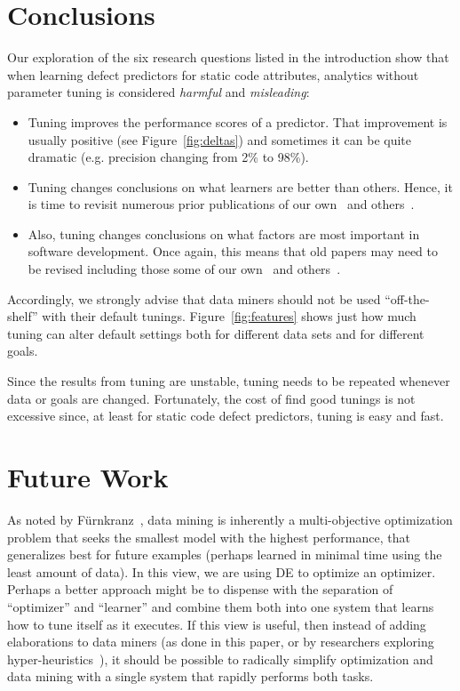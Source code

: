 \documentclass{sig-alternative}
\newcommand{\bi}{\begin{itemize}[leftmargin=0.4cm]}
\newcommand{\ei}{\end{itemize}}
\newcommand{\fig}[1]{Figure~\ref{fig:#1}}
\begin{document}
\section{Conclusions}

Our exploration of the six research
questions listed in the introduction
show that when learning defect predictors for static code
attributes,   analytics without parameter tuning is considered {\em harmful} and {\em misleading}:
\bi
\item Tuning improves the performance scores of a predictor.
That improvement is usually positive (see \fig{deltas}) and sometimes
it can be quite   dramatic (e.g. precision changing from 2\% to 98\%). \item 
Tuning changes conclusions on what learners are better than others.
Hence, it is time to revisit numerous prior publications of our own~\cite{me07b}
and others~\cite{lessmann2008benchmarking,hall11}.
\item
Also,
tuning changes conclusions on what factors are most important in software development.
Once again, this means that old papers may need to be revised including those
some of our own~\cite{me02k} and others~\cite{bell2013limited,rahman2013how,moser2008comparative,zimmermann2007predicting,herzig2013predicting}. 
\ei
Accordingly, we strongly advise that data miners should not be used ``off-the-shelf'' with their default tunings. 
\fig{features} shows just how much tuning can alter default settings
both for different data sets and for different goals. 

Since the results from tuning are unstable,
tuning needs to be repeated
whenever data or goals are changed.
Fortunately, the cost of find good tunings is not excessive since, at least for
static code defect predictors, tuning is easy and fast.

\section{Future Work}

 As noted by
F\"{u}rnkranz~\cite{furnkranz05}, data mining is inherently a multi-objective optimization
problem that seeks the smallest model with the highest performance, 
that generalizes best for
future examples (perhaps learned in minimal time using the least amount of data).
In this view, we are using DE to optimize an optimizer. Perhaps a better approach might be
to dispense with the separation of ``optimizer'' and ``learner'' and combine them both
into one system that learns how to tune itself as it executes. If this view is useful,
then instead of adding elaborations to data miners (as done in this paper, or by researchers
exploring hyper-heuristics~\cite{jia2013learning}), it should be possible to radically simplify optimization and data
mining with a single system that rapidly performs both tasks.
\end{document}

